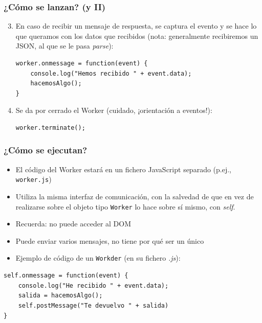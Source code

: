 
\begin{frame}[fragile]
\frametitle{¿Cómo se lanzan? (y II)}

\begin{enumerate}
  \setcounter{enumi}{2}

  \item En caso de recibir un mensaje de respuesta, se captura el evento y se hace lo que queramos con los datos que
recibidos (nota: generalmente recibiremos un JSON, al que se le pasa \emph{parse}):
  \begin{verbatim}
worker.onmessage = function(event) {
    console.log("Hemos recibido " + event.data);
    hacemosAlgo();
}
  \end{verbatim}

  \item Se da por cerrado el Worker (cuidado, ¡orientación a eventos!):
  \begin{verbatim}
worker.terminate();
  \end{verbatim}
\end{enumerate}

\end{frame}


\begin{frame}[fragile]
\frametitle{¿Cómo se ejecutan?}

\begin{itemize}
  \item El código del Worker estará en un fichero JavaScript separado (p.ej., \texttt{worker.js})
  \item Utiliza la misma interfaz de comunicación, con la salvedad de que en vez de realizarse sobre el objeto tipo \texttt{Worker} lo hace sobre sí mismo, con \emph{self}.
  \item Recuerda: no puede acceder al DOM
  \item Puede enviar varios mensajes, no tiene por qué ser un único
  \item Ejemplo de código de un \texttt{Workder} (en su fichero \emph{.js}):
\end{itemize}

\begin{verbatim}
self.onmessage = function(event) {
    console.log("He recibido " + event.data);
    salida = hacemosAlgo();
    self.postMessage("Te devuelvo " + salida)
}
\end{verbatim}

\end{frame}


